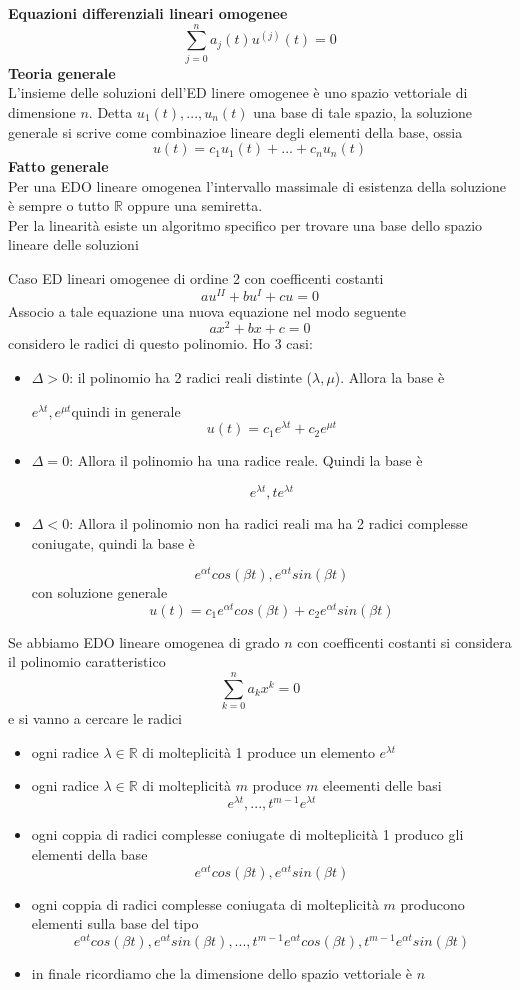 \documentclass[12pt, a4paper]{article}
\begin{document}
\textbf{Equazioni differenziali lineari omogenee}\[\sum_{j=0}^{n}a_{j}(t)u^{(j)}(t)=0\]
\textbf{Teoria generale}\\L'insieme delle soluzioni dell'ED linere omogenee è uno spazio vettoriale di dimensione
$n$. Detta $u_{1}(t),...,u_{n}(t)$ una base di tale spazio, la soluzione generale si scrive come combinazioe
lineare degli elementi della base, ossia \[u(t)=c_{1}u_{1}(t)+...+c_{n}u_{n}(t)\]
\textbf{Fatto generale}\\Per una EDO lineare omogenea l'intervallo massimale di esistenza della soluzione è sempre
o tutto $\mathbb{R}$ oppure una semiretta.\\Per la linearità esiste un algoritmo specifico per trovare una base dello
spazio lineare delle soluzioni

Caso ED lineari omogenee di ordine 2 con coefficenti costanti\[au^{II}+bu^{I}+cu=0\]Associo a tale equazione una
nuova equazione nel modo seguente \[ax^{2}+bx+c=0\] considero le radici di questo polinomio. Ho 3 casi:
\begin{itemize}
    \item $\Delta>0$: il polinomio ha 2 radici reali distinte ($\lambda,\mu$). Allora la base è

          $e^{\lambda t},e^{\mu t}$quindi in generale \[u(t)=c_{1}e^{\lambda t}+c_{2}e^{\mu t}\]
    \item $\Delta = 0$: Allora il polinomio ha una radice reale. Quindi la base è

          \[e^{\lambda t},te^{\lambda t}\]
    \item $\Delta < 0$: Allora il polinomio non ha radici reali ma ha 2 radici complesse coniugate, quindi la base è

          \[e^{\alpha t}cos(\beta t), e^{\alpha t}sin(\beta t)\] con soluzione generale
          \[u(t)=c_{1}e^{\alpha t}cos(\beta t)+c_{2} e^{\alpha t}sin(\beta t)\]
\end{itemize}

Se abbiamo EDO lineare omogenea di grado $n$ con coefficenti costanti si considera il polinomio caratteristico
\[\sum^{n}_{k=0}a_{k}x^{k}=0\] e si vanno a cercare le radici
\begin{itemize}
    \item ogni radice $\lambda\in\mathbb{R}$ di molteplicità 1 produce un elemento $e^{\lambda t}$
    \item  ogni radice $\lambda\in\mathbb{R}$ di molteplicità $m$ produce $m$ eleementi delle basi
          \[e^{\lambda t},...,t^{m-1}e^{\lambda t}\]
    \item ogni coppia di radici complesse coniugate di molteplicità 1 produco gli elementi della base
          \[e^{\alpha t}cos(\beta t), e^{\alpha t}sin(\beta t)\]
    \item ogni coppia di radici complesse coniugata di molteplicità $m$ producono elementi sulla base del tipo
          \[e^{\alpha t}cos(\beta t), e^{\alpha t}sin(\beta t),...,t^{m-1}e^{\alpha t}cos(\beta t), t^{m-1}e^{\alpha
              t}sin(\beta t)\]
    \item in finale ricordiamo che la dimensione dello spazio vettoriale è $n$
\end{itemize}
\end{document}
